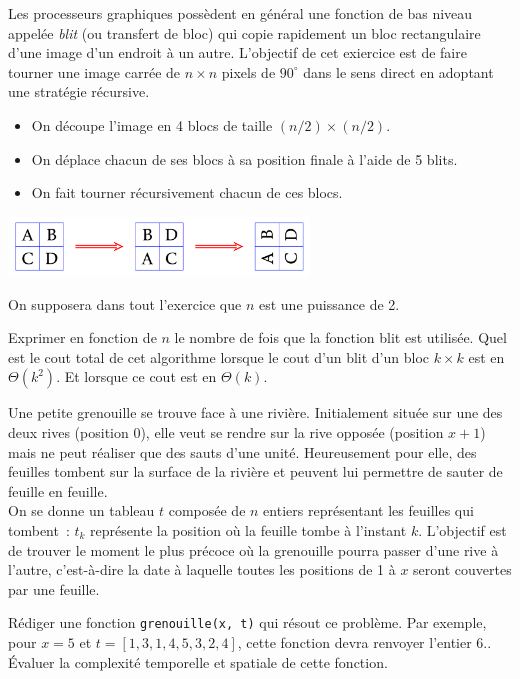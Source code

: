 \documentclass{magnoliaold}
\begin{document}
Les processeurs graphiques possèdent en général une fonction de bas niveau appelée
\emph{blit} (ou transfert de bloc) qui copie rapidement un bloc rectangulaire d'une image
d'un endroit à un autre. L'objectif de cet exiercice est de faire tourner une image carrée
de $n\times n$ pixels de $90^{\circ}$ dans le sens direct en adoptant une stratégie récursive.
\begin{itemize}
\item On découpe l'image en 4 blocs de taille $(n/2)\times(n/2)$.
\item On déplace chacun de ses blocs à sa position finale à l'aide de 5 blits.
\item On fait tourner récursivement chacun de ces blocs.
\end{itemize}
\begin{center}
\includegraphics[width=0.6\textwidth]{../../Commun/Images/python-exos-rec-2.pdf}
\end{center}
On supposera dans tout l'exercice que $n$ est une puissance de 2.
\begin{questions}
\question Exprimer en fonction de $n$ le nombre de fois que la fonction blit est utilisée.
\question Quel est le cout total de cet algorithme lorsque le cout d'un blit d'un bloc
  $k\times k$ est en $\Theta(k^2)$.
\question Et lorsque ce cout est en $\Theta(k)$.
\end{questions}


Une petite grenouille se trouve face à une rivière. Initialement située sur une des deux rives
(position 0), elle veut se rendre sur la rive opposée (position $x+1$) mais ne peut réaliser
que des sauts d'une unité. Heureusement pour elle, des feuilles tombent sur la surface de la
rivière et peuvent lui permettre de sauter de feuille en feuille.\\
On se donne un tableau $t$ composée de $n$ entiers représentant les feuilles qui tombent~:
$t_k$ représente la position où la feuille tombe à l'instant $k$. L'objectif est de trouver
le moment le plus précoce où la grenouille pourra passer d'une rive à l'autre,
c'est-à-dire la date à laquelle toutes les positions de 1 à $x$ seront couvertes par une
feuille.
\begin{questions}
\question Rédiger une fonction \verb!grenouille(x, t)! qui résout ce problème. Par exemple,
  pour $x=5$ et $t=[1, 3, 1, 4, 5, 3, 2, 4]$, cette fonction devra renvoyer l'entier 6..
\question Évaluer la complexité temporelle et spatiale de cette fonction.
\end{questions}
\end{document}
